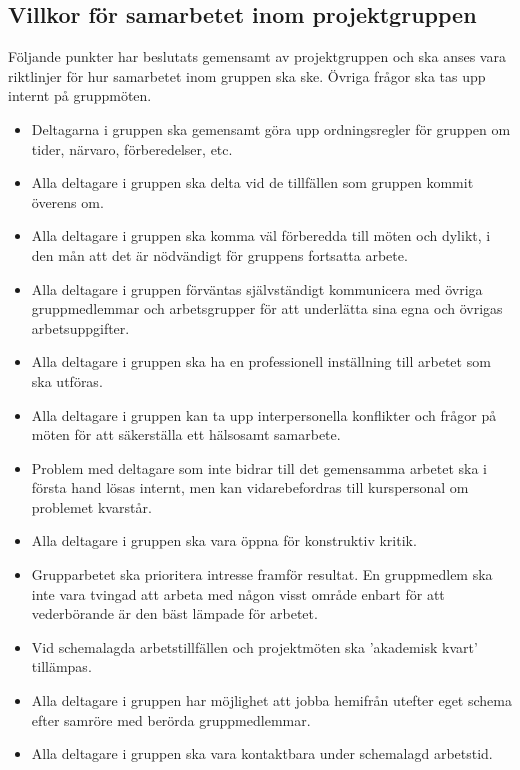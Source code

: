 \documentclass[a4paper,11pt]{article}
\begin{document}
    \subsection{Villkor för samarbetet inom projektgruppen}
    Följande punkter har beslutats gemensamt av projektgruppen och ska anses vara riktlinjer för hur samarbetet inom gruppen ska ske. Övriga frågor ska tas upp internt på gruppmöten.
    
    \begin{itemize}
        \item Deltagarna i gruppen ska gemensamt göra upp ordningsregler för gruppen om tider, närvaro, förberedelser, etc.
        \item Alla deltagare i gruppen ska delta vid de tillfällen som gruppen kommit överens om.
        \item Alla deltagare i gruppen ska komma väl förberedda till möten och dylikt, i den mån att det är nödvändigt för gruppens fortsatta arbete.
        \item Alla deltagare i gruppen förväntas självständigt kommunicera med övriga gruppmedlemmar och arbetsgrupper för att underlätta sina egna och övrigas arbetsuppgifter.
        \item Alla deltagare i gruppen ska ha en professionell inställning till arbetet som ska utföras.
        \item Alla deltagare i gruppen kan ta upp interpersonella konflikter och frågor på möten för att säkerställa ett hälsosamt samarbete.
        \item Problem med deltagare som inte bidrar till det gemensamma arbetet ska i första hand lösas internt, men kan vidarebefordras till kurspersonal om problemet kvarstår.
        \item Alla deltagare i gruppen ska vara öppna för konstruktiv kritik.
        \item Grupparbetet ska prioritera intresse framför resultat. En gruppmedlem ska inte vara tvingad att arbeta med någon visst område enbart för att vederbörande är den bäst lämpade för arbetet.
        \item Vid schemalagda arbetstillfällen och projektmöten ska 'akademisk kvart' tillämpas.
        \item Alla deltagare i gruppen har möjlighet att jobba hemifrån utefter eget schema efter samröre med berörda gruppmedlemmar.
        \item Alla deltagare i gruppen ska vara kontaktbara under schemalagd arbetstid.
    \end{itemize}
    
\end{document}
